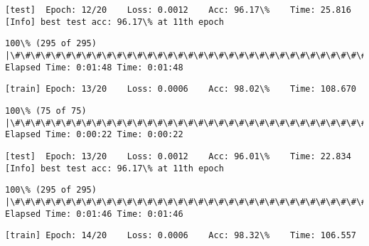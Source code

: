 \documentclass[11pt]{article}
\begin{document}
    \begin{Verbatim}[commandchars=\\\{\}]
[test]	Epoch: 12/20	Loss: 0.0012	Acc: 96.17\%	Time: 25.816
[Info] best test acc: 96.17\% at 11th epoch

    \end{Verbatim}

    \begin{Verbatim}[commandchars=\\\{\}]
100\% (295 of 295) |\#\#\#\#\#\#\#\#\#\#\#\#\#\#\#\#\#\#\#\#\#\#\#\#\#\#\#\#\#\#\#\#\#\#\#\#\#\#\#\#\#\#\#\#\#\#\#\#\#\#\#\#\#\#\#\#\#\#\#\#\#\#\#| Elapsed Time: 0:01:48 Time: 0:01:48

    \end{Verbatim}

    \begin{Verbatim}[commandchars=\\\{\}]
[train]	Epoch: 13/20	Loss: 0.0006	Acc: 98.02\%	Time: 108.670

    \end{Verbatim}

    \begin{Verbatim}[commandchars=\\\{\}]
100\% (75 of 75) |\#\#\#\#\#\#\#\#\#\#\#\#\#\#\#\#\#\#\#\#\#\#\#\#\#\#\#\#\#\#\#\#\#\#\#\#\#\#\#\#\#\#\#\#\#\#\#\#\#\#\#\#\#\#\#\#\#\#\#\#\#\#\#\#\#| Elapsed Time: 0:00:22 Time: 0:00:22

    \end{Verbatim}

    \begin{Verbatim}[commandchars=\\\{\}]
[test]	Epoch: 13/20	Loss: 0.0012	Acc: 96.01\%	Time: 22.834
[Info] best test acc: 96.17\% at 11th epoch

    \end{Verbatim}

    \begin{Verbatim}[commandchars=\\\{\}]
100\% (295 of 295) |\#\#\#\#\#\#\#\#\#\#\#\#\#\#\#\#\#\#\#\#\#\#\#\#\#\#\#\#\#\#\#\#\#\#\#\#\#\#\#\#\#\#\#\#\#\#\#\#\#\#\#\#\#\#\#\#\#\#\#\#\#\#\#| Elapsed Time: 0:01:46 Time: 0:01:46

    \end{Verbatim}

    \begin{Verbatim}[commandchars=\\\{\}]
[train]	Epoch: 14/20	Loss: 0.0006	Acc: 98.32\%	Time: 106.557

    \end{Verbatim}
\end{document}

